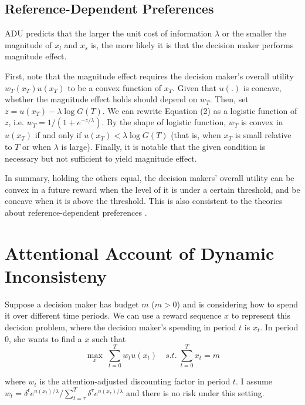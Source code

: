 \documentclass[
  12pt,
]{article}
\begin{document}
\hypertarget{reference-dependent-preferences}{%
\subsection{Reference-Dependent
Preferences}\label{reference-dependent-preferences}}

ADU predicts that the larger the unit cost of information \(\lambda\) or
the smaller the magnitude of \(x_l\) and \(x_s\) is, the more likely it
is that the decision maker performs magnitude effect.

First, note that the magnitude effect requires the decision maker's
overall utility \(w_T(x_T)u(x_T)\) to be a convex function of \(x_T\).
Given that \(u(.)\) is concave, whether the magnitude effect holds
should depend on \(w_T\). Then, set \(z = u(x_T)-\lambda\log G(T)\). We
can rewrite Equation (2) as a logistic function of \(z\), i.e.
\(w_T = 1/(1+e^{-z/\lambda})\). By the shape of logistic function,
\(w_T\) is convex in \(u(x_T)\) if and only if
\(u(x_T)<\lambda \log G(T)\) (that is, when \(x_T\) is small relative to
\(T\) or when \(\lambda\) is large). Finally, it is notable that the
given condition is necessary but not sufficient to yield magnitude
effect.

In summary, holding the others equal, the decision makers' overall
utility can be convex in a future reward when the level of it is under a
certain threshold, and be concave when it is above the threshold. This
is also consistent to the theories about reference-dependent preferences
\citep{koszegi_model_2006}.

\hypertarget{attentional-account-of-dynamic-inconsisteny}{%
\section{Attentional Account of Dynamic
Inconsisteny}\label{attentional-account-of-dynamic-inconsisteny}}

Suppose a decision maker has budget \(m\) (\(m>0\)) and is considering
how to spend it over different time periods. We can use a reward
sequence \(x\) to represent this decision problem, where the decision
maker's spending in period \(t\) is \(x_t\). In period 0, she wants to
find a \(x\) such that\[ \tag{3}
\max_{x}\;\sum_{t=0}^T w_t u(x_t)\quad s.t. \;\sum_{t=0}^T x_t = m  
\]

where \(w_t\) is the attention-adjusted discounting factor in period
\(t\). I assume
\(w_t=\delta^t e^{u(x_t)/\lambda}/\sum_{t=\tau}^T \delta^{\tau} e^{u(x_\tau)/\lambda}\)
and there is no risk under this setting.
\end{document}
